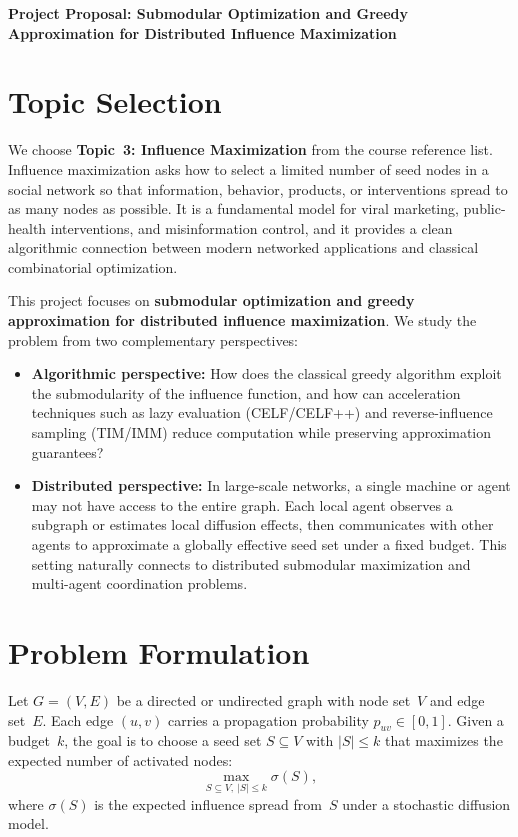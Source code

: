 \documentclass[10pt]{article}
\begin{document}
\vspace*{-4em}
\begin{center}
{\Large \textbf{Project Proposal: Submodular Optimization and Greedy Approximation for Distributed Influence Maximization}}
\end{center}
\vspace*{-1em}

\section{Topic Selection}

We choose \textbf{Topic~3: Influence Maximization} from the course reference
list. Influence maximization asks how to select a limited number of seed nodes
in a social network so that information, behavior, products, or interventions
spread to as many nodes as possible. It is a fundamental model for viral
marketing, public-health interventions, and misinformation control, and it
provides a clean algorithmic connection between modern networked applications
and classical combinatorial optimization.

This project focuses on \textbf{submodular optimization and greedy
approximation for distributed influence maximization}. We study the problem
from two complementary perspectives:
\begin{itemize}
    \item \textbf{Algorithmic perspective:} How does the classical greedy
    algorithm exploit the submodularity of the influence function, and how can
    acceleration techniques such as lazy evaluation (CELF/CELF++) and
    reverse-influence sampling (TIM/IMM) reduce computation while preserving
    approximation guarantees?
    \item \textbf{Distributed perspective:} In large-scale networks, a single
    machine or agent may not have access to the entire graph. Each local agent
    observes a subgraph or estimates local diffusion effects, then communicates
    with other agents to approximate a globally effective seed set under a fixed
    budget. This setting naturally connects to distributed submodular
    maximization and multi-agent coordination problems.
\end{itemize}

\section{Problem Formulation}

Let $G=(V,E)$ be a directed or undirected graph with node set~$V$ and edge
set~$E$. Each edge $(u,v)$ carries a propagation probability
$p_{uv}\in[0,1]$. Given a budget~$k$, the goal is to choose a seed set
$S\subseteq V$ with $|S|\leq k$ that maximizes the expected number of
activated nodes:
\[
    \max_{S\subseteq V,\ |S|\leq k} \sigma(S),
\]
where $\sigma(S)$ is the expected influence spread from~$S$ under a stochastic
diffusion model.
\end{document}
